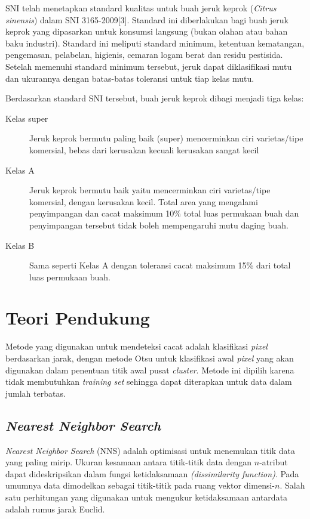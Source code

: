 \documentclass[laporan.tex]{subfiles}
\begin{document}
SNI telah menetapkan standard kualitas untuk buah jeruk keprok (\emph{Citrus sinensis}) dalam SNI 3165-2009[3]. Standard ini diberlakukan bagi buah jeruk keprok yang dipasarkan untuk konsumsi langsung (bukan olahan atau bahan baku industri). Standard ini meliputi standard minimum, ketentuan kematangan, pengemasan, pelabelan, higienis, cemaran logam berat dan residu pestisida. Setelah memenuhi standard minimum tersebut, jeruk dapat diklasifikasi mutu dan ukurannya dengan batas-batas toleransi untuk tiap kelas mutu.\cite{sni}

Berdasarkan standard SNI tersebut, buah jeruk keprok dibagi menjadi tiga kelas:

\begin{description}
\item [Kelas super] Jeruk keprok bermutu paling baik (super) mencerminkan ciri varietas/tipe komersial, bebas dari kerusakan kecuali kerusakan sangat kecil
\item [Kelas A] Jeruk keprok bermutu baik yaitu mencerminkan ciri varietas/tipe komersial, dengan kerusakan kecil. Total area yang mengalami penyimpangan dan cacat maksimum 10\% total luas permukaan buah dan penyimpangan tersebut tidak boleh mempengaruhi mutu daging buah.
\item [Kelas B] Sama seperti Kelas A dengan toleransi cacat maksimum 15\% dari total luas permukaan buah.
\end{description}

\section{Teori Pendukung}

Metode yang digunakan untuk mendeteksi cacat adalah klasifikasi \emph{pixel} berdasarkan jarak, dengan metode Otsu untuk klasifikasi awal \emph{pixel} yang akan digunakan dalam penentuan titik awal pusat \emph{cluster}. Metode ini dipilih karena tidak membutuhkan \emph{training set} sehingga dapat diterapkan untuk data dalam jumlah terbatas.

\subsection{\emph{Nearest Neighbor Search}}

\emph{Nearest Neighbor Search} (NNS) adalah optimisasi untuk menemukan titik data yang paling mirip. Ukuran kesamaan antara titik-titik data dengan $n$-atribut dapat dideskripsikan dalam fungsi ketidaksamaan \emph{(dissimilarity function)}.\cite{knuth} Pada umumnya data dimodelkan sebagai titik-titik pada ruang vektor dimensi-$n$. Salah satu perhitungan yang digunakan untuk mengukur ketidaksamaan antardata adalah rumus jarak Euclid.
\end{document}
